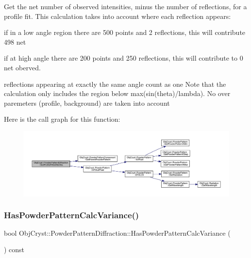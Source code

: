 Get the \textquotesingle{}net\textquotesingle{} number of observed intensities, minus the number of reflections, for a profile fit. This calculation takes into account where each reflection appears\+:
\begin{DoxyItemize}
\item if in a low angle region there are 500 points and 2 reflections, this will contribute 498 net
\item if at high angle there are 200 points and 250 reflections, this will contribute to 0 net oberved.
\item reflections appearing at exactly the same angle count as one Note that the calculation only includes the region below max(sin(theta)/lambda). No over paremeters (profile, background) are taken into account 
\end{DoxyItemize}Here is the call graph for this function\+:
\nopagebreak
\begin{figure}[H]
\begin{center}
\leavevmode
\includegraphics[width=350pt]{class_obj_cryst_1_1_powder_pattern_diffraction_a0fba98457fffa0aef1d014fb2e7fcbc3_cgraph}
\end{center}
\end{figure}
\mbox{\label{class_obj_cryst_1_1_powder_pattern_diffraction_a70c5f1b70bbe4ace8ee26120d5f85fd1}} 
\subsubsection{\texorpdfstring{HasPowderPatternCalcVariance()}{HasPowderPatternCalcVariance()}}
{\footnotesize\ttfamily bool Obj\+Cryst\+::\+Powder\+Pattern\+Diffraction\+::\+Has\+Powder\+Pattern\+Calc\+Variance (\begin{DoxyParamCaption}{ }\end{DoxyParamCaption}) const\hspace{0.3cm}{\ttfamily [virtual]}}

